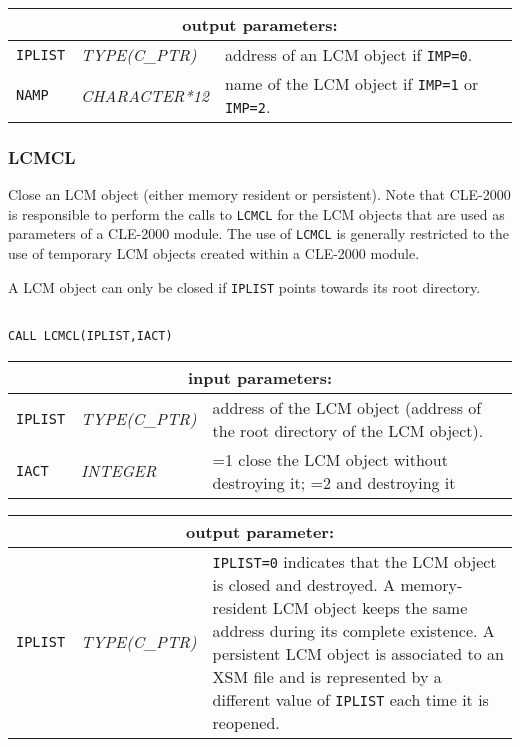 \vskip 0.8cm

\noindent
\begin{tabular}{|p{1.5cm}|p{3cm}|p{10cm}|}
\hline
\multicolumn{3}{|c|}{\bf output parameters:} \\
\hline
{\tt IPLIST} & {\it TYPE(C\_PTR)} & address of an LCM object if  {\tt IMP=0}. \\
\hline
{\tt NAMP} & {\it CHARACTER*12} & name of the LCM object if {\tt IMP=1} or {\tt IMP=2}. \\
\hline
\end{tabular}

\subsubsection{LCMCL}

Close an LCM object (either memory resident or persistent). Note that CLE-2000 is responsible to perform the calls to
{\tt LCMCL} for the LCM objects that are used as parameters of a CLE-2000 module. The use
of {\tt LCMCL} is generally restricted to the use of temporary LCM objects created within a CLE-2000 module.

\vskip 0.2cm

A LCM object can only be closed if {\tt IPLIST} points towards its root directory.

\begin{verbatim}

CALL LCMCL(IPLIST,IACT)
\end{verbatim}

\noindent
\begin{tabular}{|p{1.5cm}|p{3cm}|p{10cm}|}
\hline
\multicolumn{3}{|c|}{\bf input parameters:} \\
\hline
{\tt IPLIST} & {\it TYPE(C\_PTR)} & address of the LCM object (address of the root directory of the LCM object). \\
\hline
{\tt IACT} & {\it INTEGER} & =1 close the LCM object without destroying it; =2 and destroying it  \\
\hline
\end{tabular}

\vskip 0.8cm

\noindent
\begin{tabular}{|p{1.5cm}|p{3cm}|p{10cm}|}
\hline
\multicolumn{3}{|c|}{\bf output parameter:} \\
\hline
{\tt IPLIST} & {\it TYPE(C\_PTR)} & {\tt IPLIST=0} indicates that the LCM object is closed and destroyed. A memory-resident LCM object keeps the
same address during its complete existence. A persistent LCM object is associated to an XSM file and is represented by a different
value of {\tt IPLIST} each time it is reopened. \\
\hline
\end{tabular}

